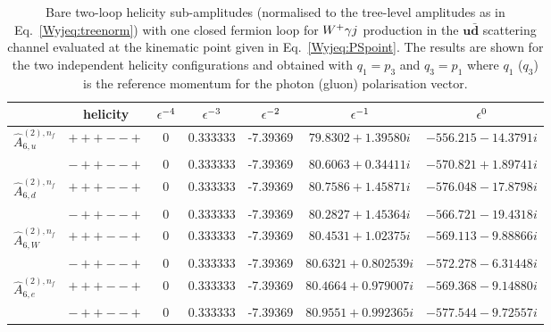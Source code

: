 \documentclass[main.tex]{subfiles}
\begin{document}
\begin{table}[t!]
\centering
\begin{tabularx}{1.0\textwidth}{|C{0.7}|C{1.0}|C{0.6}|C{1.0}|C{1.2}|C{1.2}|C{1.3}|}
\hline
      & helicity & $\epsilon^{-4}$ & $\epsilon^{-3}$ & $\epsilon^{-2}$ & $\epsilon^{-1}$ & $\epsilon^{0}$ \\
\hline
$\hat A^{(2),n_f}_{6,u}$ & $\scriptstyle +++--+$ & 0 & 0.333333 & -7.39369 & $79.8302 + 1.39580 i $ & $-556.215 - 14.3791 i$ \\ 
                     & $\scriptstyle -++--+$ & 0 & 0.333333 & -7.39369 & $80.6063 + 0.34411 i $ & $-570.821 + 1.89741 i$ \\
\hline
$\hat A^{(2),n_f}_{6,d}$ & $\scriptstyle +++--+$ & 0 & 0.333333 & -7.39369 & $80.7586 + 1.45871 i $ & $-576.048 - 17.8798 i$ \\
                     & $\scriptstyle -++--+$ & 0 & 0.333333 & -7.39369 & $80.2827 + 1.45364 i $ & $-566.721 - 19.4318 i$ \\
\hline
$\hat A^{(2),n_f}_{6,W}$ & $\scriptstyle +++--+$ & 0 & 0.333333 & -7.39369 & $80.4531 + 1.02375 i $ & $-569.113 - 9.88866 i$ \\
                     & $\scriptstyle -++--+$ & 0 & 0.333333 & -7.39369 & $80.6321 + 0.802539 i$ & $-572.278 - 6.31448 i$ \\
\hline
$\hat A^{(2),n_f}_{6,e}$ & $\scriptstyle +++--+$ & 0 & 0.333333 & -7.39369 & $80.4664 + 0.979007 i$ & $-569.368 - 9.14880 i$ \\
                     & $\scriptstyle -++--+$ & 0 & 0.333333 & -7.39369 & $80.9551 + 0.992365 i$ & $-577.544 - 9.72557 i$ \\
\hline
\end{tabularx}
\caption{\label{Wyjtab:benchmark2Lnf1bare} 
Bare two-loop helicity sub-amplitudes (normalised to the tree-level amplitudes as in Eq.~\eqref{Wyjeq:treenorm}) with one closed fermion loop  
for $W^+\gamma j$ production in the $\mathbf{u\bar{d}}$ scattering channel 
evaluated at the kinematic point given in Eq.~\eqref{Wyjeq:PSpoint}. The results are shown for the two independent helicity configurations and obtained with $q_1 = p_3$ and $q_3 = p_1$ where $q_1$ ($q_3$) is the 
reference momentum for the photon (gluon) polarisation vector.
}
\end{table}
%
\end{document}
